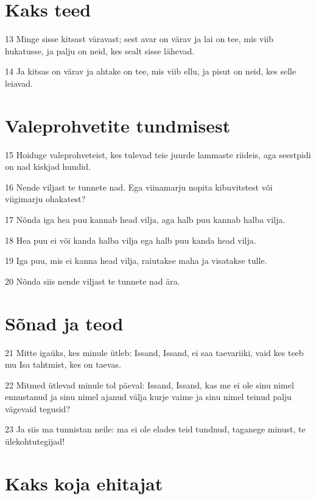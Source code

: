 \section*{Kaks teed}

\par 13 Minge sisse kitsast väravast; sest avar on värav ja lai on tee, mis viib hukatusse, ja palju on neid, kes sealt sisse lähevad.
\par 14 Ja kitsas on värav ja ahtake on tee, mis viib ellu, ja pisut on neid, kes selle leiavad.

\section*{Valeprohvetite tundmisest}

\par 15 Hoiduge valeprohveteist, kes tulevad teie juurde lammaste riideis, aga seestpidi on nad kiskjad hundid.
\par 16 Nende viljast te tunnete nad. Ega viinamarju nopita kibuvitstest või viigimarju ohakatest?
\par 17 Nõnda iga hea puu kannab head vilja, aga halb puu kannab halba vilja.
\par 18 Hea puu ei või kanda halba vilja ega halb puu kanda head vilja.
\par 19 Iga puu, mis ei kanna head vilja, raiutakse maha ja visatakse tulle.
\par 20 Nõnda siis nende viljast te tunnete nad ära.

\section*{Sõnad ja teod}

\par 21 Mitte igaüks, kes minule ütleb: Issand, Issand, ei saa taevariiki, vaid kes teeb mu Isa tahtmist, kes on taevas.
\par 22 Mitmed ütlevad minule tol päeval: Issand, Issand, kas me ei ole sinu nimel ennustanud ja sinu nimel ajanud välja kurje vaime ja sinu nimel teinud palju vägevaid tegusid?
\par 23 Ja siis ma tunnistan neile: ma ei ole elades teid tundnud, taganege minust, te ülekohtutegijad!

\section*{Kaks koja ehitajat}

